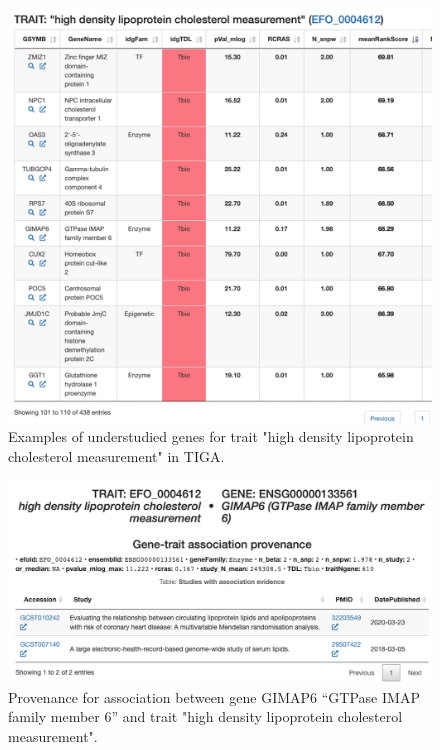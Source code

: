 \begin{figure}
	\includegraphics[width=\textwidth]{figures/tiga/FIG05_EFO_0004612_hitlist.png}
	\caption{Examples of understudied genes for trait "high density lipoprotein cholesterol measurement" in TIGA.}
	\label{fig:TIGA_05}
\end{figure}


\begin{figure}
	\includegraphics[width=\textwidth]{figures/tiga/FIG06_EFO_0004612-GIMAP6_provenance.png}
	\caption{Provenance for association between gene GIMAP6 “GTPase IMAP family member 6” and trait "high density lipoprotein cholesterol measurement".}
	\label{fig:TIGA_06}
\end{figure}


